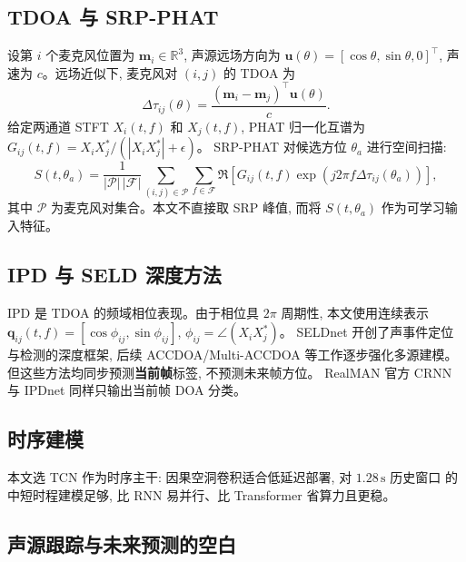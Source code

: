 \documentclass[UTF8,a4paper,11pt]{ctexart}
\begin{document}
\subsection{TDOA 与 SRP-PHAT}

设第 $i$ 个麦克风位置为 $\mathbf{m}_i\in\mathbb{R}^3$, 声源远场方向为
$\mathbf{u}(\theta)=[\cos\theta,\sin\theta,0]^\top$, 声速为 $c$。远场近似下, 麦克风对 $(i,j)$ 的 TDOA 为
\begin{equation}
  \Delta\tau_{ij}(\theta)
  = \frac{(\mathbf{m}_i-\mathbf{m}_j)^\top \mathbf{u}(\theta)}{c}.
\end{equation}
给定两通道 STFT $X_i(t,f)$ 和 $X_j(t,f)$, PHAT 归一化互谱为
$G_{ij}(t,f)={X_iX_j^*}/({|X_iX_j^*|+\epsilon})$。
SRP-PHAT 对候选方位 $\theta_a$ 进行空间扫描:
\begin{equation}
  S(t,\theta_a)
  =
  \frac{1}{|\mathcal{P}|\,|\mathcal{F}|}
  \sum_{(i,j)\in\mathcal{P}}
  \sum_{f\in\mathcal{F}}
  \Re\!\left[
    G_{ij}(t,f)
    \exp\!\left(j2\pi f\Delta\tau_{ij}(\theta_a)\right)
  \right],
  \label{eq:srp}
\end{equation}
其中 $\mathcal{P}$ 为麦克风对集合。本文不直接取 SRP 峰值, 而将 $S(t,\theta_a)$ 作为可学习输入特征。

\subsection{IPD 与 SELD 深度方法}

IPD 是 TDOA 的频域相位表现。由于相位具 $2\pi$ 周期性, 本文使用连续表示
$\mathbf{q}_{ij}(t,f)=[\cos\phi_{ij},\sin\phi_{ij}]$,
$\phi_{ij}=\angle(X_iX_j^*)$。
SELDnet \cite{adavanne2019seldnet} 开创了声事件定位与检测的深度框架, 后续 ACCDOA/Multi-ACCDOA
等工作逐步强化多源建模。但这些方法均同步预测\textbf{当前帧}标签, 不预测未来帧方位。
RealMAN 官方 CRNN 与 IPDnet \cite{wang2024ipdnet} 同样只输出当前帧 DOA 分类。

\subsection{时序建模}

本文选 TCN \cite{bai2018tcn} 作为时序主干: 因果空洞卷积适合低延迟部署, 对 $1.28\,\mathrm{s}$ 历史窗口
的中短时程建模足够, 比 RNN 易并行、比 Transformer 省算力且更稳。

\subsection{声源跟踪与未来预测的空白}
\end{document}
